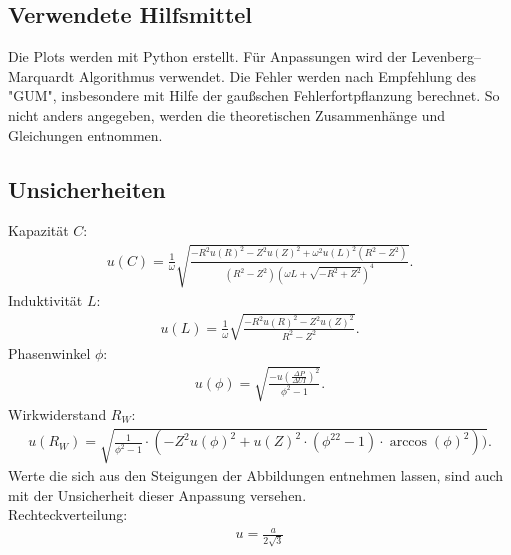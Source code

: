 


\subsection{Verwendete Hilfsmittel}
Die Plots werden mit Python erstellt. Für Anpassungen wird der  Levenberg–Marquardt Algorithmus verwendet. Die Fehler werden nach Empfehlung des "GUM", insbesondere mit Hilfe der gaußschen Fehlerfortpflanzung berechnet. So nicht anders angegeben, werden die theoretischen Zusammenhänge und Gleichungen \cite{lw} entnommen.


\subsection{Unsicherheiten}\label{kap:Unsich}
Kapazität $C$:
\begin{align*}
	u(C)=\frac{1}{\omega} \sqrt{\frac{- R^{2} u(R)^{2} - Z^{2} u(Z)^{2} + \omega^2 u(L)^{2} \left(R^{2} - Z^{2}\right)}{\left(R^{2} - Z^{2}\right) \left(\omega L + \sqrt{- R^{2} + Z^{2}}\right)^{4}}}	.
\end{align*}
Induktivität $L$:
\begin{align*}
	u(L)=\frac{1}{\omega} \sqrt{\frac{- R^{2} u(R)^{2} - Z^{2} u(Z)^{2}}{R^{2} - Z^{2}}}.
\end{align*}
Phasenwinkel $\phi$: 
\begin{align*}
	u(\phi)=\sqrt{\frac{-u\left(\frac{\Delta P}{\Delta UI}\right)^2}{\phi^2-1}}.
\end{align*}
Wirkwiderstand $R_W$:
\begin{align*}
	u(R_W)=\sqrt{\frac{1}{\phi^2-1}\cdot(-Z^2u(\phi)^2+u(Z)^2\cdot(\phi^22-1)\cdot \arccos(\phi)^2))}.
\end{align*}
Werte die sich aus  den Steigungen der Abbildungen entnehmen lassen, sind auch mit der Unsicherheit dieser Anpassung versehen.\\
Rechteckverteilung:
\begin{align}
	u=\frac{a}{2\sqrt{3}}\label{eq:sur}
\end{align}

